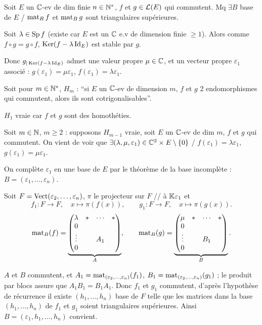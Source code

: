
\begin{statementbox}
Soit $E$ un $\mathbb C$-ev de dim finie $n\in\mathbb N^*$, $f$ et $g\in\mathcal L(E)$ qui
commutent. Mq $\exists B$ base de $E$ /
$\operatorname{mat}_B f$ et $\operatorname{mat}_B g$ sont triangulaires supérieures.
\end{statementbox}

\begin{solution}
Soit $\lambda\in\operatorname{Sp} f$ (existe car $E$ est un $\mathbb C$ e.v de dimension finie
$\geq1$).
Alors comme $f\circ g=g\circ f$, $\operatorname{Ker}(f-\lambda\operatorname{Id}_E)$ est stable par $g$.

Donc $g_{|\operatorname{Ker}(f-\lambda\operatorname{Id}_E)}$ admet une valeur propre $\mu\in\mathbb C$, et un
vecteur propre $\varepsilon_1$ associé :
$g(\varepsilon_1)=\mu\varepsilon_1$, $f(\varepsilon_1)=\lambda\varepsilon_1$.

Soit pour $m\in\mathbb N^*$, $H_m$ : ``si $E$ un $\mathbb C$-ev de dimension $m$, $f$ et $g$
2 endomorphismes qui commutent, alors ils sont cotrigonalisables''.

$H_1$ vraie car $f$ et $g$ sont des homothéties.

Soit $m\in\mathbb N$, $m\geq2$ : supposons $H_{m-1}$ vraie, soit $E$ un $\mathbb C$-ev de
dim $m$, $f$ et $g$ qui commutent. On vient de voir que
$\exists(\lambda,\mu,\varepsilon_1)\in\mathbb C^2\times E\setminus\{0\}$ /
$f(\varepsilon_1)=\lambda\varepsilon_1$, $g(\varepsilon_1)=\mu\varepsilon_1$.

On complète $\varepsilon_1$ en une base de $E$ par le théorème de la base
incomplète : $B=(\varepsilon_1,\dots,\varepsilon_n)$.

Soit $F=\operatorname{Vect}(\varepsilon_2,\dots,\varepsilon_n)$, $\pi$ le projecteur sur $F$
// à $\mathbb K\varepsilon_1$ et
\[
f_1:F\to F,\quad x\mapsto \pi(f(x)),\qquad
g_1:F\to F,\quad x\mapsto \pi(g(x)).
\]
\[
\operatorname{mat}_B(f)=
\underbrace{
\begin{pmatrix}
\lambda&*&\cdots&*\\
0&&&\\
\vdots&&A_1&\\
0&&&
\end{pmatrix}}_{A},
\qquad
\operatorname{mat}_B(g)=
\underbrace{
\begin{pmatrix}
\mu&*&\cdots&*\\
0&&&\\
\vdots&&B_1&\\
0&&&
\end{pmatrix}}_{B}.
\]

$A$ et $B$ commutent, et
$A_1=\operatorname{mat}_{(\varepsilon_2,\dots,\varepsilon_n)}(f_1)$,
$B_1=\operatorname{mat}_{(\varepsilon_2,\dots,\varepsilon_n)}(g_1)$ ; le produit par blocs
assure que $A_1B_1=B_1A_1$.
Donc $f_1$ et $g_1$ commutent, d'après l'hypothèse de récurrence il existe
$(h_1,\dots,h_n)$ base de $F$ telle que les matrices dans la base
$(h_1,\dots,h_n)$ de $f_1$ et $g_1$ soient triangulaires supérieures.
Ainsi $B=(\varepsilon_1,h_1,\dots,h_n)$ convient.


\end{solution}
